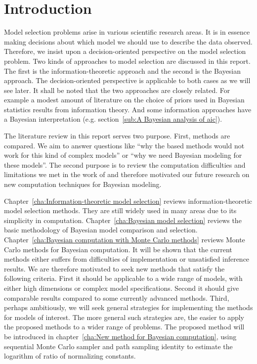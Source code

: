 \chapter{Introduction}
\label{cha:Introduction}

Model selection problems arise in various scientific research areas. It is in
essence making decisions about which model we should use to describe the data
observed. Therefore, we insist upon a decision-oriented perspective on the
model selection problem. Two kinds of approaches to model selection are
discussed in this report. The first is the information-theoretic approach and
the second is the Bayesian approach. The decision-oriented perspective is
applicable to both cases as we will see later. It shall be noted that the two
approaches are closely related. For example a modest amount of literature on
the choice of priors used in Bayesian statistics results from information
theory. And some information approaches have a Bayesian interpretation (e.g.
section~\ref{sub:A Bayesian analysis of aic}).

The literature review in this report serves two purpose. First, methods are
compared. We aim to answer questions like ``why the \aic based methods would
not work for this kind of complex models'' or ``why we need Bayesian modeling
for these models''. The second purpose is to review the computation
difficulties and limitations we met in the work of \textcite{Zhou2011} and
therefore motivated our future research on new computation techniques for
Bayesian modeling.

Chapter~\ref{cha:Information-theoretic model selection} reviews
information-theoretic model selection methods. They are still widely used in
many areas due to its simplicity in computation. Chapter~\ref{cha:Bayesian
  model selection} reviews the basic methodology of Bayesian model comparison
and selection. Chapter~\ref{cha:Bayesian computation with Monte Carlo methods}
reviews Monte Carlo methods for Bayesian computation. It will be shown that
the current methods either suffers from difficulties of implementation or
unsatisfied inference results. We are therefore motivated to seek new methods
that satisfy the following criteria. First it should be applicable to a wide
range of models, with either high dimensions or complex model specifications.
Second it should give comparable results compared to some currently advanced
methods. Third, perhaps ambitiously, we will seek general strategies for
implementing the methods for models of interest. The more general such
strategies are, the easier to apply the proposed methods to a wider range of
problems. The proposed method will be introduced in chapter~\ref{cha:New
  method for Bayesian computation}, using sequential Monte Carlo sampler and
path sampling identity to estimate the logarithm of ratio of normalizing
constants.

